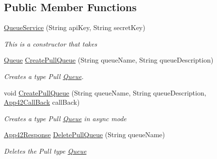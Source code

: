 \subsection*{Public Member Functions}
\begin{DoxyCompactItemize}
\item 
\hyperlink{classcom_1_1shephertz_1_1app42_1_1paas_1_1sdk_1_1csharp_1_1message_1_1_queue_service_aebf2d26a377ae9d34542ab0556c954c1}{Queue\+Service} (String api\+Key, String secret\+Key)
\begin{DoxyCompactList}\small\item\em This is a constructor that takes \end{DoxyCompactList}\item 
\hyperlink{classcom_1_1shephertz_1_1app42_1_1paas_1_1sdk_1_1csharp_1_1message_1_1_queue}{Queue} \hyperlink{classcom_1_1shephertz_1_1app42_1_1paas_1_1sdk_1_1csharp_1_1message_1_1_queue_service_a51795e6a956c059d813e4fcaea52ef73}{Create\+Pull\+Queue} (String queue\+Name, String queue\+Description)
\begin{DoxyCompactList}\small\item\em Creates a type Pull \hyperlink{classcom_1_1shephertz_1_1app42_1_1paas_1_1sdk_1_1csharp_1_1message_1_1_queue}{Queue}. \end{DoxyCompactList}\item 
void \hyperlink{classcom_1_1shephertz_1_1app42_1_1paas_1_1sdk_1_1csharp_1_1message_1_1_queue_service_acedb50370f0585300565c808c4f7999a}{Create\+Pull\+Queue} (String queue\+Name, String queue\+Description, \hyperlink{interfacecom_1_1shephertz_1_1app42_1_1paas_1_1sdk_1_1csharp_1_1_app42_call_back}{App42\+Call\+Back} call\+Back)
\begin{DoxyCompactList}\small\item\em Creates a type Pull \hyperlink{classcom_1_1shephertz_1_1app42_1_1paas_1_1sdk_1_1csharp_1_1message_1_1_queue}{Queue} in async mode \end{DoxyCompactList}\item 
\hyperlink{classcom_1_1shephertz_1_1app42_1_1paas_1_1sdk_1_1csharp_1_1_app42_response}{App42\+Response} \hyperlink{classcom_1_1shephertz_1_1app42_1_1paas_1_1sdk_1_1csharp_1_1message_1_1_queue_service_ab3e4fef552d3a5a3e359fe19513ad8b9}{Delete\+Pull\+Queue} (String queue\+Name)
\begin{DoxyCompactList}\small\item\em Deletes the Pull type \hyperlink{classcom_1_1shephertz_1_1app42_1_1paas_1_1sdk_1_1csharp_1_1message_1_1_queue}{Queue} \end{DoxyCompactList}\item 

\end{DoxyCompactItemize}
